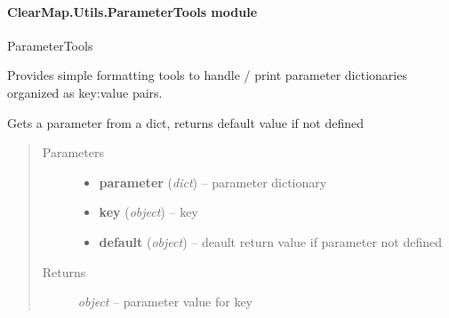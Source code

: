 \documentclass[letterpaper,10pt,english]{sphinxmanual}
\begin{document}
\paragraph{ClearMap.Utils.ParameterTools module}
\label{api/ClearMap.Utils:module-ClearMap.Utils.ParameterTools}\label{api/ClearMap.Utils:clearmap-utils-parametertools-module}
ParameterTools

Provides simple formatting tools to handle / print parameter dictionaries
organized as key:value pairs.

\begin{fulllineitems}
\label{api/ClearMap.Utils:ClearMap.Utils.ParameterTools.getParameter}
Gets a parameter from a dict, returns default value if not defined
\begin{quote}\begin{description}
\item[{Parameters}] \leavevmode\begin{itemize}
\item {} 
\textbf{parameter} (\emph{dict}) --
parameter dictionary

\item {} 
\textbf{key} (\emph{object}) --
key

\item {} 
\textbf{default} (\emph{object}) --
deault return value if parameter not defined

\end{itemize}

\item[{Returns}] \leavevmode
\emph{object} --
parameter value for key

\end{description}\end{quote}

\end{fulllineitems}

\end{document}
